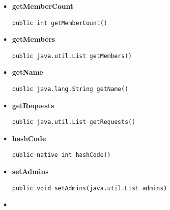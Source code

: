 \documentclass[11pt,a4paper]{report}
\begin{document}
{{{{{\begin{itemize}
{\begin{lstlisting}[frame=none]
public java.lang.String getImagePath()\end{lstlisting} %
}%
\item{ 
\hypertarget{edu.kit.pse17.go_app.PersistenceLayer.GroupEntity.getMemberCount()}{{\bf  getMemberCount}\\}
\begin{lstlisting}[frame=none]
public int getMemberCount()\end{lstlisting} %
}%
\item{ 
\hypertarget{edu.kit.pse17.go_app.PersistenceLayer.GroupEntity.getMembers()}{{\bf  getMembers}\\}
\begin{lstlisting}[frame=none]
public java.util.List getMembers()\end{lstlisting} %
}%
\item{ 
\hypertarget{edu.kit.pse17.go_app.PersistenceLayer.GroupEntity.getName()}{{\bf  getName}\\}
\begin{lstlisting}[frame=none]
public java.lang.String getName()\end{lstlisting} %
}%
\item{ 
\hypertarget{edu.kit.pse17.go_app.PersistenceLayer.GroupEntity.getRequests()}{{\bf  getRequests}\\}
\begin{lstlisting}[frame=none]
public java.util.List getRequests()\end{lstlisting} %
}%
\item{ 
\hypertarget{edu.kit.pse17.go_app.PersistenceLayer.GroupEntity.hashCode()}{{\bf  hashCode}\\}
\begin{lstlisting}[frame=none]
public native int hashCode()\end{lstlisting} %
}%
\item{ 
\hypertarget{edu.kit.pse17.go_app.PersistenceLayer.GroupEntity.setAdmins(java.util.List)}{{\bf  setAdmins}\\}
\begin{lstlisting}[frame=none]
public void setAdmins(java.util.List admins)\end{lstlisting} %
}%
\item{ 
}
\end{itemize}}}}}}
\end{document}
